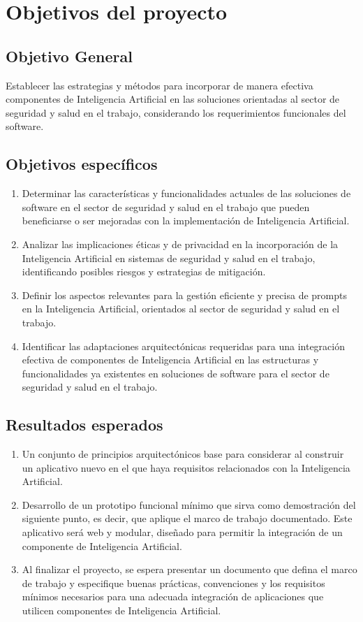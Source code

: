 \section{Objetivos del proyecto}
\subsection{Objetivo General}
Establecer las estrategias y métodos para incorporar de manera efectiva componentes de Inteligencia Artificial en las soluciones orientadas al sector de seguridad y salud en el trabajo, considerando los requerimientos funcionales del software.

\subsection{Objetivos específicos}
\begin{enumerate}
    \item Determinar las características y funcionalidades actuales de las soluciones de software en el sector de seguridad y salud en el trabajo que pueden beneficiarse o ser mejoradas con la implementación de Inteligencia Artificial.
    \item Analizar las implicaciones éticas y de privacidad en la incorporación de la Inteligencia Artificial en sistemas de seguridad y salud en el trabajo, identificando posibles riesgos y estrategias de mitigación.
    \item Definir los aspectos relevantes para la gestión eficiente y precisa de prompts en la Inteligencia Artificial, orientados al sector de seguridad y salud en el trabajo.
    \item Identificar las adaptaciones arquitectónicas requeridas para una integración efectiva de componentes de Inteligencia Artificial en las estructuras y funcionalidades ya existentes en soluciones de software para el sector de seguridad y salud en el trabajo.
\end{enumerate}

\subsection{Resultados esperados}
\begin{enumerate}
    \item Un conjunto de principios arquitectónicos base para considerar al construir un aplicativo nuevo en el que haya requisitos relacionados con la Inteligencia Artificial.
    \item Desarrollo de un prototipo funcional mínimo que sirva como demostración del siguiente punto, es decir, que aplique el marco de trabajo documentado. Este aplicativo será web y modular, diseñado para permitir la integración de un componente de Inteligencia Artificial.
    \item Al finalizar el proyecto, se espera presentar un documento que defina el marco de trabajo y especifique buenas prácticas, convenciones y los requisitos mínimos necesarios para una adecuada integración de aplicaciones que utilicen componentes de Inteligencia Artificial.
\end{enumerate}